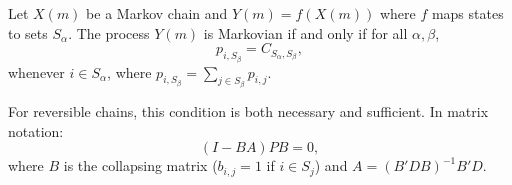 Let $X(m)$ be a Markov chain and $Y(m) = f(X(m))$ where $f$ maps states to sets $S_\alpha$. The process $Y(m)$ is Markovian if and only if for all $\alpha, \beta$,
$$p_{i, S_\beta} = C_{S_\alpha, S_\beta},$$
whenever $i \in S_\alpha$, where $p_{i, S_\beta} = \sum_{j \in S_\beta} p_{i,j}$.

For reversible chains, this condition is both necessary and sufficient. In matrix notation:
$$(I - BA)PB = 0,$$
where $B$ is the collapsing matrix ($b_{i,j} = 1$ if $i \in S_j$) and $A = (B'DB)^{-1}B'D$.
